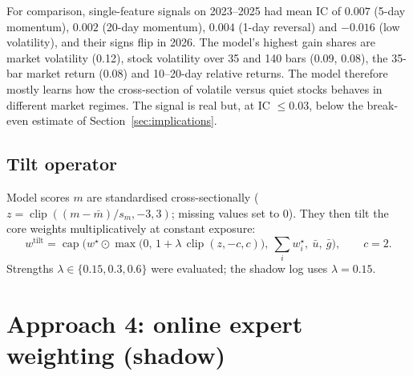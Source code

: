\documentclass[11pt,a4paper]{article}
\DeclareMathOperator{\clip}{clip}
\begin{document}
For comparison, single-feature signals on 2023--2025 had mean IC of $0.007$ (5-day momentum), $0.002$ (20-day momentum),
$0.004$ (1-day reversal) and $-0.016$ (low volatility), and their signs flip in 2026. The model's highest gain shares are
market volatility (0.12), stock volatility over 35 and 140 bars (0.09, 0.08), the 35-bar market return (0.08) and
10--20-day relative returns. The model therefore mostly learns how the cross-section of volatile versus quiet stocks
behaves in different market regimes. The signal is real but, at IC $\le0.03$, below the break-even estimate of
Section~\ref{sec:implications}.

\subsection{Tilt operator}
Model scores $m$ are standardised cross-sectionally ($z=\clip((m-\bar m)/s_m,-3,3)$; missing values set to 0). They
then tilt the core weights multiplicatively at constant exposure:
\begin{equation}
  w^{\text{tilt}}=\operatorname{cap}\!\Big(w^\star\odot\max\big(0,\,1+\lambda\,\clip(z,-c,c)\big),\ \textstyle\sum_iw^\star_i,\ \bar u,\ \bar g\Big),
  \qquad c=2 .
\end{equation}
Strengths $\lambda\in\{0.15,0.3,0.6\}$ were evaluated; the shadow log uses $\lambda=0.15$.

\section{Approach 4: online expert weighting (shadow)}\label{sec:online}
\end{document}
